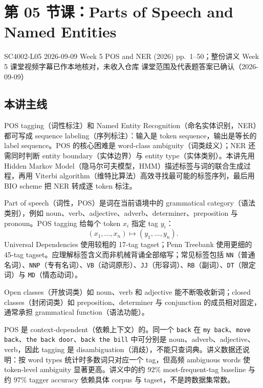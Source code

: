 
\section{第 05 节课：Parts of Speech and Named Entities}
\label{lecture:SC4002-L05}

\lecturemeta
  {SC4002-L05}
  {2026-09-09}
  {Week 5 POS and NER (2026)}
  {pp.~1--50；整份讲义}
  {Week 5 课堂视频字幕已作本地核对，未收入仓库}
  {课堂范围及代表题答案已确认（2026-09-09）}

\subsection{本讲主线}

POS tagging（词性标注）和 Named Entity Recognition（命名实体识别，NER）都可写成 sequence labeling（序列标注）：输入是 token sequence，输出是等长的 label sequence。POS 的核心困难是 word-class ambiguity（词类歧义）；NER 还需同时判断 entity boundary（实体边界）与 entity type（实体类别）。本讲先用 Hidden Markov Model（隐马尔可夫模型，HMM）描述标签与词的联合生成过程，再用 Viterbi algorithm（维特比算法）高效寻找最可能的标签序列，最后用 BIO scheme 把 NER 转成逐 token 标注。


Part of speech（词性，POS）是词在当前语境中的 grammatical category（语法类别），例如 noun、verb、adjective、adverb、determiner、preposition 与 pronoun。POS tagging 给每个 token $x_i$ 指定 tag $y_i$：
\[
  (x_1,\ldots,x_n)\longmapsto(y_1,\ldots,y_n).
\]
Universal Dependencies 使用较粗的 17-tag tagset；Penn Treebank 使用更细的 45-tag tagset。应理解标签含义而非机械背诵全部缩写；常见标签包括 \texttt{NN}（普通名词）、\texttt{NNP}（专有名词）、\texttt{VB}（动词原形）、\texttt{JJ}（形容词）、\texttt{RB}（副词）、\texttt{DT}（限定词）与 \texttt{MD}（情态动词）。

Open classes（开放词类）如 noun、verb 和 adjective 能不断吸收新词；closed classes（封闭词类）如 preposition、determiner 与 conjunction 的成员相对固定，通常承担 grammatical function（语法功能）。

POS 是 context-dependent（依赖上下文）的。同一个 \texttt{back} 在 \texttt{my back}、\texttt{move back}、\texttt{the back door}、\texttt{back the bill} 中可分别是 noun、adverb、adjective、verb，因此 tagging 是 disambiguation（消歧），不能只查词典。讲义数据还说明：按 word types 统计时多数词只对应一个 tag，但高频 ambiguous words 使 token-level ambiguity 显著更高。讲义中的约 $92\%$ most-frequent-tag baseline 与约 $97\%$ tagger accuracy 依赖具体 corpus 与 tagset，不是跨数据集常数。

